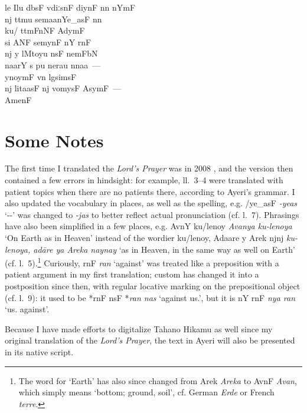 \documentclass[12pt,paper=a4]{scrartcl}
\newcommand{\fw}[1]{\textit{#1}} %
\newcommand{\tit}[1]{\textit{#1}} %
\newcommand{\qq}[1]{\enquote*{#1}} %
\newcommand{\ayr}[1]{{\Tagati #1}}
\newenvironment{ayeri}{
    \Tagati
}{
}
\begin{document}
\begin{raggedright}
\begin{multicols}{2}
\begin{ayeri}
\begin{linenumbers*}
le Ilu dbsF vdiːsnF diynF nn nYmF \\
nj ttmu semaanYe\_asF nn \\
ku/ ttmFnNF AdymF \\
si ANF semynF nY rnF \\
nj y lMtoyu nsF nemFbN \\
naarY s pu nerau nnaa~— \\ [0.5\baselineskip]

ynoymF vn lgsimsF \\
nj litaasF nj vomysF AsymF~— \\ [0.5\baselineskip]

AmenF

\end{linenumbers*}

\end{ayeri}
\end{multicols}
\end{raggedright}

\section{Some Notes}
The first time I translated the \tit{Lord's Prayer} was in 2008 
\parencite[cf.][]{becker2008}, and the version then contained a few errors in 
hindsight: for example, ll.~3--4 were translated with patient topics when there 
are no patients there, according to Ayeri's grammar. I also updated the 
vocabulary in places, as well as the spelling, e.g. \ayr{/ye\_asF} \fw{-yeas} 
\qq{-\Pl{}-\Parg{}} was changed to \fw{-jas} to better reflect actual 
pronunciation (cf. l.~7). Phrasings have also been simplified in a few places, 
e.g. \ayr{AvnY ku/lenoy} \fw{Avanya ku-lenoya} `On Earth as in Heaven' instead 
of the wordier \ayr{ku/lenoy, Adaare y Arek njnj} \fw{ku-lenoya, adāre 
ya Areka naynay} `as in Heaven, in the same way as well on Earth' (cf. 
l.~5).\footnote{The word for `Earth' has also since changed from \ayr{Arek} 
\fw{Areka} to \ayr{AvnF} \fw{Avan}, which simply means `bottom; ground, soil', 
cf. German \fw{Erde} or French \fw{terre}.} Curiously, \ayr{rnF} \fw{ran} 
`against' was treated like a preposition with a patient argument in my first 
translation; custom has changed it into a postposition since then, with regular 
locative marking on the prepositional object (cf. l.~9): it used to be 
*\ayr{rnF nsF} *\fw{ran nas} `against us.\Parg{}', but it is \ayr{nY rnF} 
\fw{nya ran} `us.\Loc{} against'.

Because I have made efforts to digitalize Tahano Hikamu as well since my 
original translation of the \tit{Lord's Prayer}, the text in Ayeri will also be 
presented in its native script.
\end{document}
